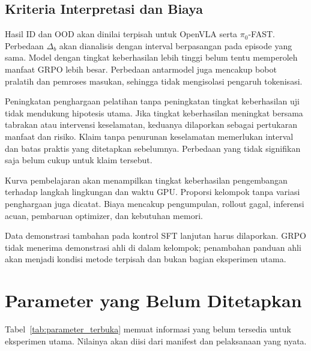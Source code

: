 \subsection{Kriteria Interpretasi dan Biaya}
Hasil ID dan OOD akan dinilai terpisah untuk OpenVLA serta $\pi_0$-FAST. Perbedaan $\Delta_b$ akan dianalisis dengan interval berpasangan pada episode yang sama. Model dengan tingkat keberhasilan lebih tinggi belum tentu memperoleh manfaat GRPO lebih besar. Perbedaan antarmodel juga mencakup bobot pralatih dan pemroses masukan, sehingga tidak mengisolasi pengaruh tokenisasi.

Peningkatan penghargaan pelatihan tanpa peningkatan tingkat keberhasilan uji tidak mendukung hipotesis utama. Jika tingkat keberhasilan meningkat bersama tabrakan atau intervensi keselamatan, keduanya dilaporkan sebagai pertukaran manfaat dan risiko. Klaim tanpa penurunan keselamatan memerlukan interval dan batas praktis yang ditetapkan sebelumnya. Perbedaan yang tidak signifikan saja belum cukup untuk klaim tersebut.

Kurva pembelajaran akan menampilkan tingkat keberhasilan pengembangan terhadap langkah lingkungan dan waktu GPU. Proporsi kelompok tanpa variasi penghargaan juga dicatat. Biaya mencakup pengumpulan, rollout gagal, inferensi acuan, pembaruan optimizer, dan kebutuhan memori.

Data demonstrasi tambahan pada kontrol SFT lanjutan harus dilaporkan. GRPO tidak menerima demonstrasi ahli di dalam kelompok; penambahan panduan ahli akan menjadi kondisi metode terpisah dan bukan bagian eksperimen utama.

\section{Parameter yang Belum Ditetapkan}
\label{sec:parameter_terbuka}
Tabel~\ref{tab:parameter_terbuka} memuat informasi yang belum tersedia untuk eksperimen utama. Nilainya akan diisi dari manifest dan pelaksanaan yang nyata.

